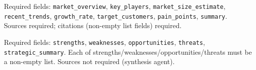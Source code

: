 \documentclass[12pt,a4paper,oneside]{book}
\begin{document}
\begin{infobox}
Required fields: \texttt{market\_overview}, \texttt{key\_players}, \texttt{market\_size\_estimate},
\texttt{recent\_trends}, \texttt{growth\_rate}, \texttt{target\_customers}, \texttt{pain\_points}, \texttt{summary}.
Sources required; citations (non-empty list fields) required.
\end{infobox}

\begin{infobox}
Required fields: \texttt{strengths}, \texttt{weaknesses}, \texttt{opportunities}, \texttt{threats},
\texttt{strategic\_summary}. Each of strengths/weaknesses/opportunities/threats must be a non-empty list.
Sources not required (synthesis agent).
\end{infobox}

\printbibliography[heading=bibintoc, title={Bibliography}]

\printglossary[title={Glossary}, toctitle={Glossary}]
\end{document}
